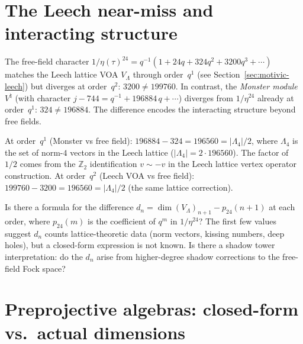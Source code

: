 \documentclass[11pt]{article}
\newcommand{\Z}{\mathbb{Z}}
\begin{document}
\section{The Leech near-miss and interacting structure}
\label{sec:leech-near-miss}

The free-field character $1/\eta(\tau)^{24} = q^{-1}(1 + 24q + 324q^2 + 3200q^3 + \cdots)$ matches the Leech lattice VOA $V_\Lambda$ through order~$q^1$ (see Section~\ref{sec:motivic-leech}) but diverges at order~$q^2$: $3200 \neq 199760$. In contrast, the \emph{Monster module} $V^\natural$ (with character $j - 744 = q^{-1} + 196884\,q + \cdots$) diverges from $1/\eta^{24}$ already at order~$q^1$: $324 \neq 196884$. The difference encodes the interacting structure beyond free fields.

At order~$q^1$ (Monster vs free field): $196884 - 324 = 196560 = |\Lambda_4|/2$, where $\Lambda_4$ is the set of norm-$4$ vectors in the Leech lattice ($|\Lambda_4| = 2 \cdot 196560$). The factor of $1/2$ comes from the $\Z_2$ identification $v \sim -v$ in the Leech lattice vertex operator construction. At order~$q^2$ (Leech VOA vs free field): $199760 - 3200 = 196560 = |\Lambda_4|/2$ (the same lattice correction).

\begin{question}
Is there a formula for the difference $d_n = \dim(V_\Lambda)_{n+1} - p_{24}(n+1)$ at each order, where $p_{24}(m)$ is the coefficient of $q^m$ in $1/\eta^{24}$? The first few values suggest $d_n$ counts lattice-theoretic data (norm vectors, kissing numbers, deep holes), but a closed-form expression is not known. Is there a shadow tower interpretation: do the $d_n$ arise from higher-degree shadow corrections to the free-field Fock space?
\end{question}


\section{Preprojective algebras: closed-form vs.\ actual dimensions}
\label{sec:preprojective-subtlety}
\end{document}
